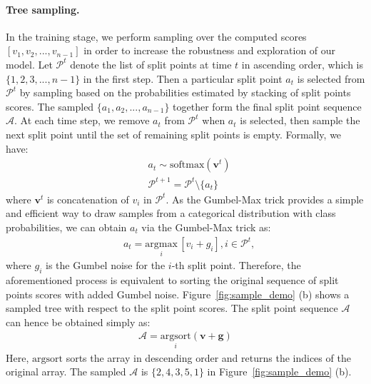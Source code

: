 \paragraph{Tree sampling.}
In the training stage, we perform sampling over the computed scores $[v_1, v_2, ..., v_{n-1}]$ in order to increase the robustness and exploration of our model.
Let $\mathcal{P}^{t}$ denote the list of split points at time $t$ in ascending order, which is $\{1,2,3,...,n\!-\!1\}$ in the first step. 
Then a particular split point $a_{t}$ is selected from $\mathcal{P}^{t}$ by sampling based on the probabilities estimated by stacking of split points scores. The sampled
$\{a_{1}, a_{2}, ..., a_{n-1}\}$ together form the final split point sequence $\mathcal{A}$. 
At each time step, we remove $a_{t}$ from $\mathcal{P}^{t}$ when $a_{t}$ is selected, then sample the next split point until the set of remaining split points is empty. Formally, we have:
\begin{align}
&a_{t} \sim \mathrm{softmax}(\textbf{v}^t)\\
&\mathcal{P}^{t+1}=\mathcal{P}^{t}\setminus \{{a_{t}}\}
\end{align}
where $\textbf{v}^t$ is concatenation of $v_{i}$ in $\mathcal{P}^{t}$.
As the Gumbel-Max trick \cite{GUMBEL,DBLP:conf/nips/MaddisonTM14} provides a simple and efficient way
to draw samples from a categorical distribution with class probabilities, we can obtain $a_{t}$ via the Gumbel-Max trick as:
\begin{align}
&a_{t} = \underset{i}{\mathrm{argmax}}\,[v_{i}+g_{i}], i \in \mathcal{P}^{t},
\end{align}
where $g_{i}$ is the Gumbel noise for the $i$-{th} split point. 
Therefore, the aforementioned process is equivalent to sorting the original sequence of split points scores with added Gumbel noise.
Figure~\ref{fig:sample_demo} (b) shows a sampled tree with respect to the split point scores.
The split point sequence $\mathcal{A}$ can hence be obtained simply as:
\begin{align}
\mathcal{A} = \underset{i}{\mathrm{argsort}}(\textbf{v} + \textbf{g})
\end{align}
Here, $\mathrm{argsort}$ sorts the array in descending order and returns the indices of the original array.
The sampled $\mathcal{A}$ is $\{2, 4, 3, 5, 1\}$ in Figure~\ref{fig:sample_demo} (b).

